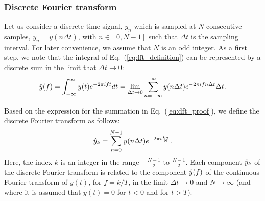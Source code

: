 \subsubsection*{Discrete Fourier transform} %
Let us consider a discrete-time signal, $y_n$ which is sampled at $N$ consecutive samples, $y_n = y(n \Delta t)$, with $n \in \left[0,N-1 \right ]$ such that $\Delta t$ is the sampling interval. For later convenience, we assume that $N$ is an odd integer. As a first step, we note that the integral of Eq.~(\ref{eq:fft_definition}) can be represented by a discrete sum in the limit that $\Delta t \to 0$:
\begin{equation}\label{eq:dft_proof}
\hat{y}(f) = \int_{-\infty}^{\infty} y(t) e^{-2\pi {i} f t} dt =
\lim_{\Delta t \to 0}
\sum_{n=-\infty}^\infty y(n\Delta t) e^{-2\pi {i} f n \Delta t} \Delta t.
\end{equation}

Based on the expression for the summation in Eq.~(\ref{eq:dft_proof}), we define the discrete Fourier transform as follows:
\begin{equation}\label{eq:DFT_definiton}
\hat{y}_k= \sum_{n=0}^{N-1} y(n\Delta t) e^{-2\pi {i} \frac{k n}{N}}.
\end{equation}
Here, the index $k$ is an integer in the range $-\frac{N-1}{2}$ to $\frac{N-1}{2}$.
Each component $\hat{y}_k$ of the discrete Fourier transform is related to the component $\hat{y}(f)$ of the continuous Fourier transform of $y(t)$, for $f = k/T$, in the limit $\Delta t \to 0$ and $N \to \infty$ (and where it is assumed that $y(t) = 0$ for $t < 0$ and for $t > T$).

